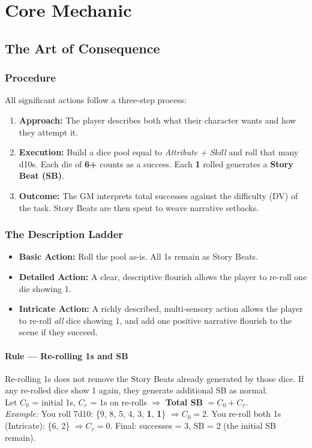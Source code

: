 

\section{Core Mechanic}

\subsection{The Art of Consequence}

\subsubsection{Procedure}
All significant actions follow a three-step process:
\begin{enumerate}
  \item \textbf{Approach:} The player describes both what their character wants and how they attempt it.
  \item \textbf{Execution:} Build a dice pool equal to \emph{Attribute + Skill} and roll that many d10s. Each die of \textbf{6+} counts as a success. Each \textbf{1} rolled generates a \textbf{Story Beat (SB)}.
  \item \textbf{Outcome:} The GM interprets total successes against the difficulty (DV) of the task. Story Beats are then spent to weave narrative setbacks.
\end{enumerate}

\subsubsection{The Description Ladder}
\begin{itemize}
  \item \textbf{Basic Action:} Roll the pool as-is. All 1s remain as Story Beats.
  \item \textbf{Detailed Action:} A clear, descriptive flourish allows the player to re-roll one die showing 1.
  \item \textbf{Intricate Action:} A richly described, multi-sensory action allows the player to re-roll \emph{all} dice showing 1, and add one positive narrative flourish to the scene if they succeed.
\end{itemize}

\paragraph{Rule — Re-rolling 1s and SB}
Re-rolling 1s does not remove the Story Beats already generated by those dice. If any re-rolled dice show 1 again, they generate additional SB as normal.\\
Let $C_0$ = initial 1s, $C_r$ = 1s on re-rolls $\Rightarrow$ \textbf{Total SB} $= C_0 + C_r$.\\
\emph{Example:} You roll 7d10: \{9, 8, 5, 4, 3, \textbf{1}, \textbf{1}\} $\Rightarrow C_0=2$. You re-roll both 1s (Intricate): \{6, 2\} $\Rightarrow C_r=0$. Final: successes = 3, SB = 2 (the initial SB remain).


